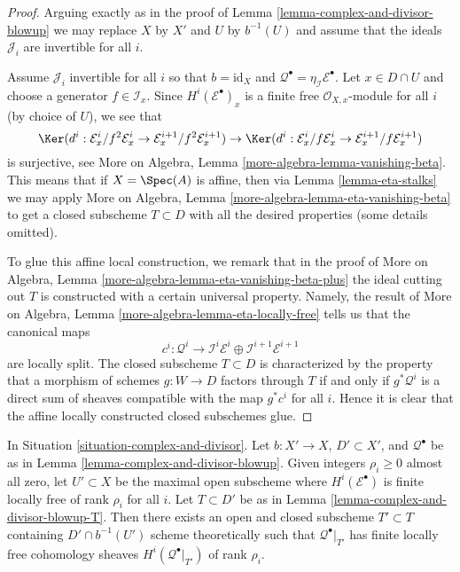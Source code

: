 \begin{proof}
Arguing exactly as in the proof of Lemma \ref{lemma-complex-and-divisor-blowup}
we may replace $X$ by $X'$ and $U$ by $b^{-1}(U)$ and assume that the ideals
$\mathcal{J}_i$ are invertible for all $i$.

\medskip\noindent
Assume $\mathcal{J}_i$ invertible for all $i$ so that $b = \text{id}_X$
and $\mathcal{Q}^\bullet = \eta_{\mathcal{I}}\mathcal{E}^\bullet$.
Let $x \in D \cap U$ and choose a generator $f \in \mathcal{I}_x$.
Since $H^i(\mathcal{E}^\bullet)_x$ is a finite free
$\mathcal{O}_{X, x}$-module for all $i$ (by choice of $U$),
we see that
$$
\Ker(d^i : \mathcal{E}^i_x/f^2\mathcal{E}^i_x \to
\mathcal{E}^{i + 1}_x/f^2\mathcal{E}^{i + 1}_x)
\to
\Ker(d^i : \mathcal{E}^i_x/f\mathcal{E}^i_x \to
\mathcal{E}^{i + 1}_x/f\mathcal{E}^{i + 1}_x)
$$
is surjective, see
More on Algebra, Lemma \ref{more-algebra-lemma-vanishing-beta}.
This means that if $X = \Spec(A)$ is affine, then via
Lemma \ref{lemma-eta-stalks} we may apply
More on Algebra, Lemma \ref{more-algebra-lemma-eta-vanishing-beta}
to get a closed subscheme $T \subset D$ with all the desired
properties (some details omitted).

\medskip\noindent
To glue this affine local construction, we remark that in the proof of 
More on Algebra, Lemma \ref{more-algebra-lemma-eta-vanishing-beta-plus}
the ideal cutting out $T$ is constructed with a certain universal
property. Namely, the result of
More on Algebra, Lemma \ref{more-algebra-lemma-eta-locally-free}
tells us that the canonical maps
$$
c^i : \mathcal{Q}^i \to
\mathcal{I}^i\mathcal{E}^i \oplus \mathcal{I}^{i + 1}\mathcal{E}^{i + 1}
$$
are locally split. The closed subscheme $T \subset D$ is characterized
by the property that a morphism of schemes $g : W \to D$ factors through
$T$ if and only if $g^*\mathcal{Q}^i$ is a direct sum of sheaves compatible
with the map $g^*c^i$ for all $i$. Hence it is clear
that the affine locally constructed closed subschemes glue.
\end{proof}

\begin{lemma}
\label{lemma-complex-and-divisor-blowup-T-ranks}
In Situation \ref{situation-complex-and-divisor}. Let $b : X' \to X$,
$D' \subset X'$, and $\mathcal{Q}^\bullet$ be as in
Lemma \ref{lemma-complex-and-divisor-blowup}.
Given integers $\rho_i \geq 0$ almost all zero, let $U' \subset X$ be
the maximal open subscheme where $H^i(\mathcal{E}^\bullet)$ is finite locally
free of rank $\rho_i$ for all $i$.
Let $T \subset D'$ be as in Lemma \ref{lemma-complex-and-divisor-blowup-T}.
Then there exists an open and closed subscheme $T' \subset T$
containing $D' \cap b^{-1}(U')$ scheme theoretically
such that $\mathcal{Q}^\bullet|_{T'}$ has finite locally free
cohomology sheaves $H^i(\mathcal{Q}^\bullet|_{T'})$ of
rank $\rho_i$.
\end{lemma}

